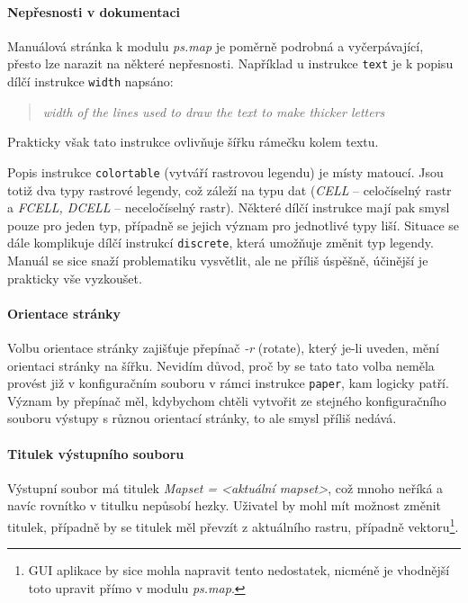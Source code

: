 \documentclass[a4paper,12pt,draft]{article}
\newcommand{\modul}[1]{\emph{#1}}
\newcommand{\instr}[1]{\lstinline[style=psmapInline]|#1|}
\begin{document}
\paragraph*{Nepřesnosti v dokumentaci}
\label{sec:psmap:manual}
Manuálová stránka \cite{manual} k modulu \modul{ps.map} je poměrně podrobná a vyčerpávající, přesto lze narazit na některé nepřesnosti. Například u instrukce \instr{text} je k popisu dílčí instrukce \instr{width} napsáno:
 \begin{quotation}\it
width of the lines used to draw the text to make thicker letters
\end{quotation}
Prakticky však tato instrukce ovlivňuje šířku rámečku kolem textu.

Popis instrukce \instr{colortable} (vytváří rastrovou legendu) je místy matoucí. Jsou totiž dva typy rastrové legendy, což záleží na typu dat (\emph{CELL} -- celočíselný rastr a \emph{FCELL, DCELL} -- neceločíselný rastr). Některé dílčí instrukce mají pak smysl pouze pro jeden typ, případně se jejich význam pro jednotlivé typy liší. Situace se dále komplikuje dílčí instrukcí \instr{discrete}, která umožňuje změnit typ legendy. Manuál se sice snaží problematiku vysvětlit, ale ne příliš úspěšně, účinější je prakticky vše vyzkoušet.

\paragraph*{Orientace stránky}
Volbu orientace stránky zajišťuje přepínač \emph{-r} (rotate), který je-li uveden, mění orientaci stránky na šířku. Nevidím důvod, proč by se tato tato volba neměla provést již v konfiguračním souboru v rámci instrukce \instr{paper}, kam logicky patří. Význam by přepínač měl, kdybychom chtěli vytvořit ze stejného konfiguračního souboru výstupy s různou orientací stránky, to ale smysl příliš nedává.

\paragraph*{Titulek výstupního souboru}
Výstupní soubor má titulek \emph{Mapset = \textless aktuální mapset\textgreater}, což mnoho neříká a navíc rovnítko v titulku nepůsobí hezky. Uživatel by mohl mít možnost změnit titulek, případně by se titulek měl převzít z aktuálního rastru, případně vektoru\footnote{GUI aplikace by sice mohla napravit tento nedostatek, nicméně je vhodnější toto upravit přímo v modulu \modul{ps.map}.}.
\end{document}
